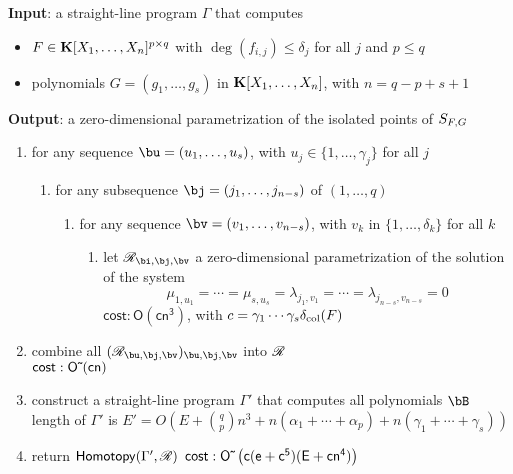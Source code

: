 \documentclass[12pt]{article}
\begin{document}
\begin{algorithm}
\caption{$\mathsf{ColumnDegree}(\Gamma)$}
{\bf Input}: a straight-line program $\Gamma$ that computes 
\begin{itemize}  
\setlength\itemsep{0em}
\item $F \in \mathbf{K}[X_1, \ldots, X_n]^{p \times q}$ with $\deg(f_{i,j}) \leq \delta_j$ for all $j$ and $p \le q$
\item polynomials $G = (g_1, \ldots, g_s)$ in $\mathbf{K}[X_1, \ldots, X_n]$, with $n=q-p+s+1$
\end{itemize}
{\bf Output}: a zero-dimensional parametrization of the isolated points of $S_{{F},G}$
\begin{enumerate}\setlength\itemsep{0em}
\item for any sequence $\bu=(u_1,\dots,u_s)$, with $u_j \in \{1,\dots,\gamma_j\}$ for all $j$
\begin{enumerate}\setlength\itemsep{0em}
\item for any subsequence $\bj=(j_1,\dots,j_{n-s})$ of $(1,\dots,q)$
\begin{enumerate}\setlength\itemsep{0em}
\item for any sequence $\bv=(v_1,\dots,v_{n-s})$, with $v_k$ in $\{1,\dots,\delta_k\}$ for all $k$
\begin{enumerate}\setlength\itemsep{0em}
 \item let $\scrR_{\bi,\bj,\bv}$ a zero-dimensional parametrization of the solution of the system 
$$\mu_{1,u_1}=\cdots=\mu_{s,u_s}=\lambda_{j_1,v_1}=\cdots=\lambda_{j_{n-s},v_{n-s}}=0$$
$\mathsf{cost: O(cn^3)}$, with $c=\gamma_1\cdots\gamma_s \delta_{\rm col}({F})$
\end{enumerate}
\end{enumerate}
\end{enumerate}
\item combine all $(\scrR_{\bu,\bj,\bv})_{\bu,\bj,\bv}$ into $\mathscr{R}$\\
$\mathsf{cost: {O}{\,\tilde{ }\,}(cn)}$

\item construct a straight-line program $\Gamma'$ that computes all polynomials $\bB$\\
  length of $\Gamma'$ is $E'=O(E + {q \choose p} n^3 + n
(\alpha_1+\cdots+\alpha_p) + n(\gamma_1 + \cdots + \gamma_s))$

\item return $\mathsf{Homotopy}(\Gamma',\mathscr{R})$ 
$\mathsf{cost: {O}{\,\tilde{ }\,}\left (c(e+c^5 )(E + cn^4)\right)}$
\end{enumerate}
\label{ColHom}
\end{algorithm}
\end{document}
